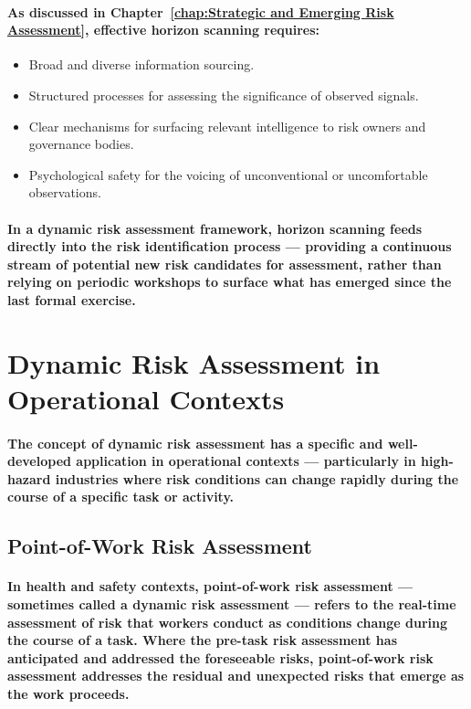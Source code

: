 \paragraph{As discussed in Chapter~\ref{chap:Strategic and Emerging Risk Assessment}, effective horizon scanning requires:}
\begin{itemize}
  \item{Broad and diverse information sourcing.}
  \item{Structured processes for assessing the significance of observed signals.}
  \item{Clear mechanisms for surfacing relevant intelligence to risk owners and governance bodies.}
  \item{Psychological safety for the voicing of unconventional or uncomfortable observations.}
\end{itemize}
\paragraph{In a dynamic risk assessment framework, horizon scanning feeds directly into the risk identification process — providing a continuous stream of potential new risk candidates for assessment, rather than relying on periodic workshops to surface what has emerged since the last formal exercise.}

\section{Dynamic Risk Assessment in Operational Contexts}
\paragraph{The concept of dynamic risk assessment has a specific and well-developed application in operational contexts — particularly in high-hazard industries where risk conditions can change rapidly during the course of a specific task or activity.}

\subsection{Point-of-Work Risk Assessment}
\paragraph{In health and safety contexts, \textbf{point-of-work risk assessment} — sometimes called a dynamic risk assessment — refers to the real-time assessment of risk that workers conduct as conditions change during the course of a task. Where the pre-task risk assessment has anticipated and addressed the foreseeable risks, point-of-work risk assessment addresses the residual and unexpected risks that emerge as the work proceeds.}
